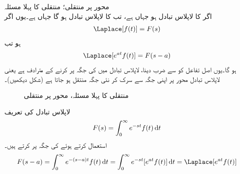 \quad {} محور پر منتقلی؛ منتقلی کا پہلا مسئلہ\\
اگر  کا لاپلاس تبادل  ہو جہاں  ہے، تب  کا لاپلاس تبادل  ہو گا جہاں  ہے۔یوں اگر
\begin{align*}
\Laplace[f(t)]=F(s)
\end{align*}
ہو تب 
\begin{align*}
\Laplace[e^{at}f(t)]=F(s-a)
\end{align*}
ہو گا۔یوں اصل تفاعل کو  سے ضرب دینا، لاپلاس تبادل میں  کی جگہ  پر کرنے کے مترادف ہے یعنی لاپلاس تبادل  محور پر اپنی جگہ سے سرک کر نئی جگہ منتقل ہو جاتا ہے (شکل  دیکھیں)۔ 
\begin{figure}
\centering
{}
\caption{منتقلی کا پہلا مسئلہ،  محور پر منتقلی}
\label{شکل_لاپلاس_تعددی_منتقلی}
\end{figure}
لاپلاس تبادل کی تعریف
\begin{align*}
F(s)=\int_{0}^{\infty}e^{-st} f(t)\dif t
\end{align*}
استعمال کرتے ہوئے  کی جگہ  پر کرتے ہیں۔
\begin{align*}
F(s-a)=\int_{0}^{\infty}e^{-(s-a)t} f(t)\dif t=\int_{0}^{\infty}e^{-st} [e^{at}f(t)]\dif t=\Laplace[e^{at}f(t)]
\end{align*}

